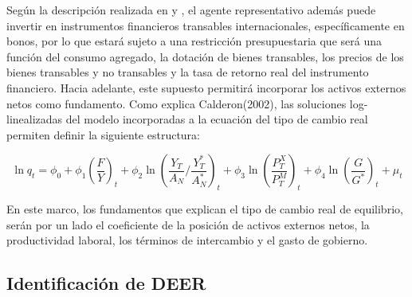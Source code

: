 \documentclass[12pt,letterpaper]{article}
\begin{document}
Según la descripción realizada en \cite{Calderon2002panel} y \cite{Calderon2004exchange}, el agente representativo además puede invertir en instrumentos financieros transables internacionales, específicamente en bonos, por lo que estará sujeto a una restricción presupuestaria que será una función del consumo agregado, la dotación de bienes transables, los precios de los bienes transables y no transables y la tasa de retorno real del instrumento financiero. Hacia adelante, este supuesto permitirá incorporar los activos externos netos como fundamento. Como explica Calderon(2002), las soluciones log-linealizadas del modelo incorporadas a la ecuación del tipo de cambio real permiten definir la siguiente estructura: 

\begin{equation}
\ln q_t=\phi_0+\phi_1\left(\frac{F}{Y}\right)_t+\phi_2\ln\left(\frac{Y_T}{A_N} / \frac{Y_T^*}{A_N^*}\right)_t+\phi_3\ln\left(\frac{P_T^X}{P_T^M}\right)_t+\phi_4\ln\left(\frac{G}{G^*}\right)_t+\mu_t
\end{equation}

En este marco, los fundamentos que explican el tipo de cambio real de equilibrio, serán por un lado el coeficiente de la posición de activos externos netos, la productividad laboral, los términos de intercambio y el gasto de gobierno.  

\subsection*{Identificación de DEER}
\end{document}
